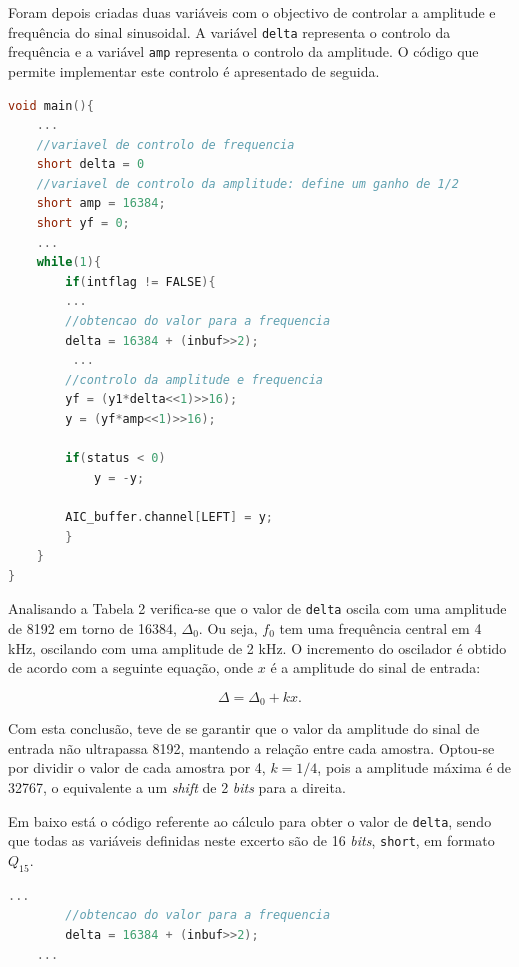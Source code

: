 \documentclass[11pt]{article}
\numberwithin{equation}{section}
\begin{document}

Foram depois criadas duas variáveis com o objectivo de controlar a amplitude e frequência do sinal sinusoidal. A variável \texttt{delta} representa o controlo da frequência e a variável \texttt{amp} representa o controlo da amplitude. O código que permite implementar este controlo é apresentado de seguida.  

\begin{lstlisting}[language=C]
void main(){
	...
	//variavel de controlo de frequencia
	short delta = 0
	//variavel de controlo da amplitude: define um ganho de 1/2 
	short amp = 16384; 
	short yf = 0;
	...
	while(1){          
		if(intflag != FALSE){
		...	
		//obtencao do valor para a frequencia		
		delta = 16384 + (inbuf>>2); 
		 ...
		//controlo da amplitude e frequencia
		yf = (y1*delta<<1)>>16);
		y = (yf*amp<<1)>>16);
		
		if(status < 0)
			y = -y;
			
		AIC_buffer.channel[LEFT] = y;
		}
	}
}
\end{lstlisting}

Analisando a Tabela 2 verifica-se que o valor de \texttt{delta} oscila com uma amplitude de 8192 em torno de 16384, $\Delta_{0}$. Ou seja, $f_{0}$ tem uma frequência central em 4 kHz, oscilando com uma amplitude de 2 kHz. O incremento do oscilador é obtido de acordo com a seguinte equação, onde $x$ é a amplitude do sinal de entrada: 

\vspace{-3mm}
\begin{equation}
\Delta = \Delta_{0} + kx.
\end{equation}

\vspace{1mm}
Com esta conclusão, teve de se garantir que o valor da amplitude do sinal de entrada não ultrapassa 8192, mantendo a relação entre cada amostra. Optou-se por dividir o valor de cada amostra por 4, $k = 1/4$, pois a amplitude máxima é de 32767, o equivalente a um \textit{shift} de 2 \textit{bits} para a direita. 

Em baixo está o código referente ao cálculo para obter o valor de \texttt{delta}, sendo que todas as variáveis definidas neste excerto são de 16 \textit{bits}, \texttt{short}, em formato $Q_{15}$.

\begin{lstlisting}[language=C]
	...	
		//obtencao do valor para a frequencia		
		delta = 16384 + (inbuf>>2); 
	...
\end{lstlisting}
\end{document}
